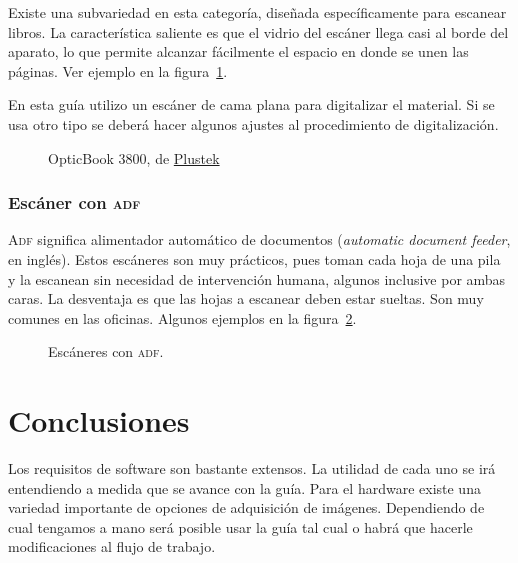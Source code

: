 \documentclass[%
	a5paper,
	10pt,
	twoside,
	openright,
	final,
]{memoir}
\begin{document}
	Existe una subvariedad en esta categoría, diseñada específicamente para escanear libros. La característica saliente es que el vidrio del escáner llega casi al borde del aparato, lo que permite alcanzar fácilmente el espacio en donde se unen las páginas. Ver ejemplo en la figura~\ref{fig:scannerOpticBook3800}.

	En esta guía utilizo un escáner de cama plana para digitalizar el material. Si se usa otro tipo se deberá hacer algunos ajustes al procedimiento de digitalización.

	\begin{figure}
		\hfill
		\caption{OpticBook 3800, de \href{https://plustek.com/es/products/book-scanners/}{Plustek}\label{fig:scannerOpticBook3800}}
	\end{figure}

	\subsubsection{Escáner con \texorpdfstring{\textsc{adf}}{ADF}} \textsc{Adf} significa alimentador automático de documentos (\emph{automatic document feeder}, en inglés). Estos escáneres son muy prácticos, pues toman cada hoja de una pila y la escanean sin necesidad de intervención humana, algunos inclusive por ambas caras. La desventaja es que las hojas a escanear deben estar sueltas. Son muy comunes en las oficinas. Algunos ejemplos en la figura~\ref{fig:scannerADF}.

	\begin{figure}
		\hspace*{\fill}
		\hfill
		\hspace*{\fill}
		\caption{Escáneres con \textsc{adf}\label{fig:scannerADF}.}
	\end{figure}

	\section{Conclusiones} Los requisitos de software son bastante extensos. La utilidad de cada uno se irá entendiendo a medida que se avance con la guía. Para el hardware existe una variedad importante de opciones de adquisición de imágenes. Dependiendo de cual tengamos a mano será posible usar la guía tal cual o habrá que hacerle modificaciones al flujo de trabajo.
\end{document}
